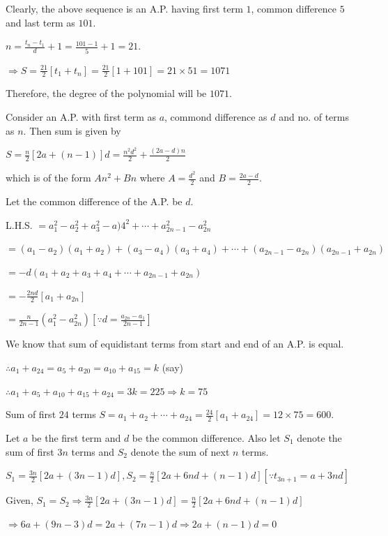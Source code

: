   Clearly, the above sequence is an A.P. having first term $1$, common difference $5$ and last term as $101$.

  $n = \frac{t_n - t_1}{d} + 1 = \frac{101 - 1}{5} + 1 = 21$.

  $\Rightarrow S = \frac{21}{2}[t_1 + t_n] = \frac{21}{2}[1 + 101] = 21\times 51 = 1071$

  Therefore, the degree of the polynomial will be $1071$.
\item Consider an A.P. with first term as $a$, commond difference as $d$ and no. of terms as $n$. Then sum is given by

  $S = \frac{n}{2}[2a + (n - 1)]d = \frac{n^2d^2}{2} + \frac{(2a - d)n}{2}$

  which is of the form $An^2 + Bn$ where $A = \frac{d^2}{2}$ and $B = \frac{2a - d}{2}$.
\item Let the common difference of the A.P. be $d$.

  L.H.S. $= a_1^2 - a_2^2 + a_3^2 - a)4^2 + \cdots + a_{2n - 1}^2 -a_{2n}^2$

  $= (a_1 - a_2)(a_1 + a_2) + (a_3 - a_4)(a_3 + a_4) + \cdots + (a_{2n - 1} - a_{2n})(a_{2n - 1} + a_{2n})$

  $= -d(a_1 + a_2 + a_3 + a_4 + \cdots + a_{2n - 1} + a_{2n})$

  $= -\frac{2nd}{2}[a_1 + a_{2n}]$

  $= \frac{n}{2n - 1}(a_1^2 - a_{2n}^2)\left[\because d = \frac{a_{2n} - a_1}{2n - 1}\right]$
\item We know that sum of equidistant terms from start and end of an A.P. is equal.

  $\therefore a_1 + a_{24} = a_5 + a_{20} = a_{10} + a_{15} = k$ (say)

  $\therefore a_1 + a_5 + a_{10} + a_{15} + a_{24} = 3k = 225 \Rightarrow k = 75$

  Sum of first $24$ terms $S = a_1 + a_2 + \cdots + a_{24} = \frac{24}{2}[a_1 + a_{24}] = 12\times75 = 600$.
\item Let $a$ be the first term and $d$ be the common difference. Also let $S_1$ denote the sum of first $3n$ terms and $S_2$
  denote the sum of next $n$ terms.

  $S_1 = \frac{3n}{2}[2a + (3n - 1)d], S_2 = \frac{n}{2}[2a + 6nd + (n - 1)d][\because t_{3n+1} = a + 3nd]$

  Given, $S_1 = S_2 \Rightarrow \frac{3n}{2}[2a + (3n - 1)d] = \frac{n}{2}[2a + 6nd + (n - 1)d]$

  $\Rightarrow 6a + (9n - 3)d = 2a + (7n - 1)d \Rightarrow 2a + (n - 1)d = 0$

